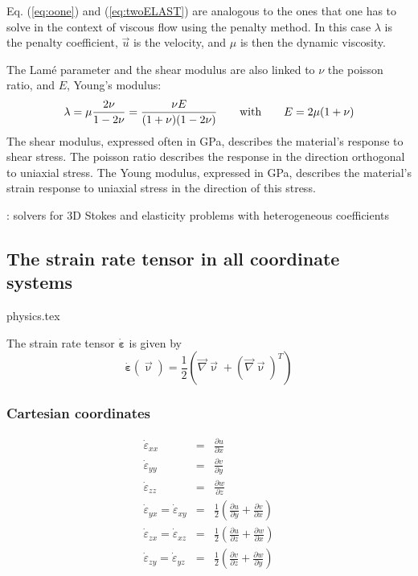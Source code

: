 

\begin{remark}
Eq. (\ref{eq:oone}) and (\ref{eq:twoELAST}) are analogous to the ones that one has to solve
in the context of viscous flow using the penalty method. In this case $\lambda$ is the penalty coefficient, 
$\vec{u}$ is the velocity, and $\mu$ is then the dynamic viscosity.
\end{remark}

The Lam\'e parameter and the shear modulus are also linked to $\nu$ the poisson ratio, 
and $E$, Young's modulus:  
\[
\lambda=\mu\frac{2\nu}{1-2\nu}
=\frac{\nu E}{(1+\nu)(1-2\nu)}
\quad\quad
{\rm with}
\quad\quad
E=2\mu(1+\nu)
\]
The shear modulus, expressed often in GPa, describes the material's response to shear stress.
The poisson ratio describes the response in the direction orthogonal to uniaxial stress.
The Young modulus, expressed in GPa, describes the material's strain response to uniaxial stress in the 
direction of this stress.


\Literature: solvers for 3D Stokes and elasticity problems with
heterogeneous coefficients \cite{samb20}




\newpage
\subsection{The strain rate tensor in all coordinate systems}
\begin{flushright} {\tiny {\color{gray} physics.tex}} \end{flushright}

The strain rate tensor $\dot{\bm\varepsilon}$ is given by
\begin{equation}
\dot{\bm \varepsilon}({\vec \upnu}) = \frac{1}{2}( {\vec \nabla}{\vec \upnu}+ ({\vec \nabla}{\vec \upnu})^T) 
\end{equation}

\subsubsection{Cartesian coordinates}
\begin{eqnarray}
\dot\varepsilon_{xx} &=& \frac{\partial u}{\partial x} \\
\dot\varepsilon_{yy} &=& \frac{\partial v}{\partial y} \\
\dot\varepsilon_{zz} &=& \frac{\partial w}{\partial z} \\
\dot\varepsilon_{yx} =
\dot\varepsilon_{xy} &=& \frac{1}{2} \left( \frac{\partial u}{\partial y} + \frac{\partial v}{\partial x}  \right)\\
\dot\varepsilon_{zx} =
\dot\varepsilon_{xz} &=& \frac{1}{2} \left( \frac{\partial u}{\partial z} + \frac{\partial w}{\partial x}  \right)\\
\dot\varepsilon_{zy} =
\dot\varepsilon_{yz} &=& \frac{1}{2} \left( \frac{\partial v}{\partial z} + \frac{\partial w}{\partial y}  \right)
\end{eqnarray}

